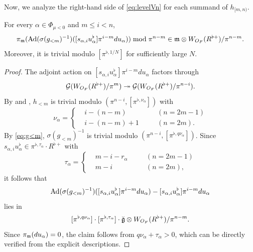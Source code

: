 \documentclass[12pt,reqno]{amsart}
\begin{document}
Now, we analyze the right-hand side of \eqref{eq:levelVn} for each summand of $h_{[m, n)}$. 

\begin{lem} \label{lem:compute_h_mn}
    For every $\alpha \in \Phi_{\mu < 0}$ and $m \leq i < n$, 
    \[
        \pi_{{\mathfrak{m}}}({\operatorname{Ad}}(\sigma(g_{<m})^{-1})([s_{\alpha,i}u_\alpha^\flat]\pi^{i-m}du_\alpha)) \bmod \pi^{n-m} \in {\mathfrak{m}} \otimes W_{O_F}(R^{\flat +}) / \pi^{n-m}. 
    \]
    Moreover, it is trivial modulo $[\pi^{\flat, 1/N}]$ for sufficiently large $N$. 
\end{lem}
\begin{proof}
    The adjoint action on $[s_{\alpha,i}u_\alpha^\flat]\pi^{i-m}du_\alpha$ factors through 
    \[
        {\mathcal{G}}(W_{O_F}(R^{\flat +})/\pi^{m}) \twoheadrightarrow {\mathcal{G}}(W_{O_F}(R^{\flat +})/\pi^{n-i}). 
    \]
    By  and , $h_{<m}$ is trivial modulo $(\pi^{n - i}, [\pi^{\flat, \nu_\alpha}])$ with
    \[
        \nu_\alpha = \left\{
            \begin{alignedat}{4}
                & i-(n-m) & \quad & (n = 2m - 1) \\
                & i-(n-m)+1 & \quad & (n = 2m).  
            \end{alignedat}
        \right.
    \]
    By \eqref{eq:g<m}, $\sigma(g_{<m})^{-1}$ is trivial modulo $(\pi^{n - i}, [\pi^{\flat, q \nu_\alpha}])$. Since $s_{\alpha,i}u_\alpha^\flat \in \pi^{\flat, \tau_\alpha} \cdot R^{\flat +}$ with 
    \[
        \tau_\alpha = \left\{
            \begin{alignedat}{4}
                & m - i - r_\alpha & \quad & (n = 2m - 1) \\
                & m - i & \quad & (n = 2m), 
            \end{alignedat}
        \right.
    \]
    it follows that 
    \[
        {\operatorname{Ad}}(\sigma(g_{<m})^{-1})([s_{\alpha,i}u_\alpha^\flat]\pi^{i-m}du_\alpha) - [s_{\alpha,i}u_\alpha^\flat]\pi^{i-m}du_\alpha
    \]
    lies in 
    \[
        [\pi^{\flat, q \nu_\alpha}] \cdot [\pi^{\flat, \tau_{\alpha}}] \cdot {\mathfrak{\breve{g}}}\otimes W_{O_F}(R^{\flat +})/\pi^{n - m}. 
    \]
    Since $\pi_{{\mathfrak{m}}}(du_\alpha) = 0$, the claim follows from $q\nu_\alpha + \tau_\alpha > 0$, which can be directly verified from the explicit descriptions. 
\end{proof}
\end{document}
